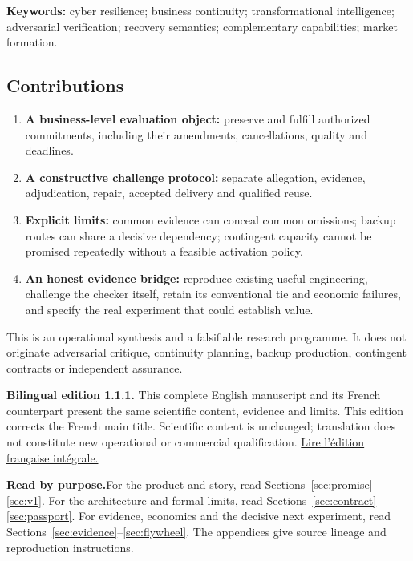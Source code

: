 \documentclass[11pt,a4paper]{article}
\newcommand{\chapterpage}{\clearpage}
\begin{document}
\textbf{Keywords:} cyber resilience; business continuity; transformational intelligence; adversarial verification; recovery semantics; complementary capabilities; market formation.

\subsection*{Contributions}
\begin{enumerate}
\item \textbf{A business-level evaluation object:} preserve and fulfill authorized commitments, including their amendments, cancellations, quality and deadlines.
\item \textbf{A constructive challenge protocol:} separate allegation, evidence, adjudication, repair, accepted delivery and qualified reuse.
\item \textbf{Explicit limits:} common evidence can conceal common omissions; backup routes can share a decisive dependency; contingent capacity cannot be promised repeatedly without a feasible activation policy.
\item \textbf{An honest evidence bridge:} reproduce existing useful engineering, challenge the checker itself, retain its conventional tie and economic failures, and specify the real experiment that could establish value.
\end{enumerate}
This is an operational synthesis and a falsifiable research programme. It does not originate adversarial critique, continuity planning, backup production, contingent contracts or independent assurance.

\chapterpage
\begingroup
\small
\setlength{\parskip}{2pt}
\tableofcontents
\endgroup
\vspace{5mm}
\noindent\textbf{Bilingual edition 1.1.1.} This complete English manuscript and its French counterpart present the same scientific content, evidence and limits. This edition corrects the French main title. Scientific content is unchanged; translation does not constitute new operational or commercial qualification. \href{https://montrealai.github.io/AGI-Alpha-Invention-Flywheel-Lab/continuity-omega-fr.html}{Lire l'édition française intégrale.}

\begin{scopebox}
\textbf{Read by purpose.}\enspace For the product and story, read Sections~\ref{sec:promise}--\ref{sec:v1}. For the architecture and formal limits, read Sections~\ref{sec:contract}--\ref{sec:passport}. For evidence, economics and the decisive next experiment, read Sections~\ref{sec:evidence}--\ref{sec:flywheel}. The appendices give source lineage and reproduction instructions.
\end{scopebox}
\end{document}
